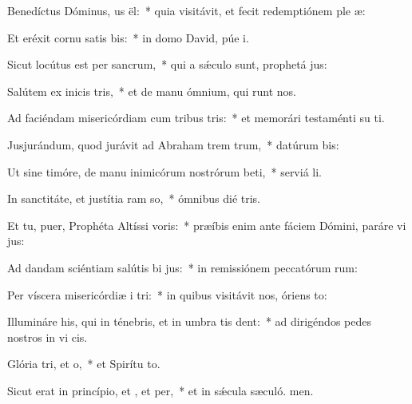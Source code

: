 \item Benedíctus Dóminus, us ël:~* quia visitávit, et fecit redemptiónem ple æ:
\item Et eréxit cornu satis bis:~* in domo David, púe i.
\item Sicut locútus est per  sancrum,~* qui a sǽculo sunt, prophetá jus:
\item Salútem ex inicis tris,~* et de manu ómnium, qui runt nos.
\item Ad faciéndam misericórdiam cum tribus tris:~* et memorári testaménti su ti.
\item Jusjurándum, quod jurávit ad Abraham trem trum,~* datúrum  bis:
\item Ut sine timóre, de manu inimicórum nostrórum beti,~* serviá li.
\item In sanctitáte, et justítia ram so,~* ómnibus dié tris.
\item Et tu, puer, Prophéta Altíssi voris:~* præíbis enim ante fáciem Dómini, paráre vi jus:
\item Ad dandam sciéntiam salútis bi jus:~* in remissiónem peccatórum rum:
\item Per víscera misericórdiæ i tri:~* in quibus visitávit nos, óriens  to:
\item Illumináre his, qui in ténebris, et in umbra tis dent:~* ad dirigéndos pedes nostros in vi cis.
\item Glória tri, et o,~* et Spirítu to.
\item Sicut erat in princípio, et , et per,~* et in sǽcula sæculó. men.
